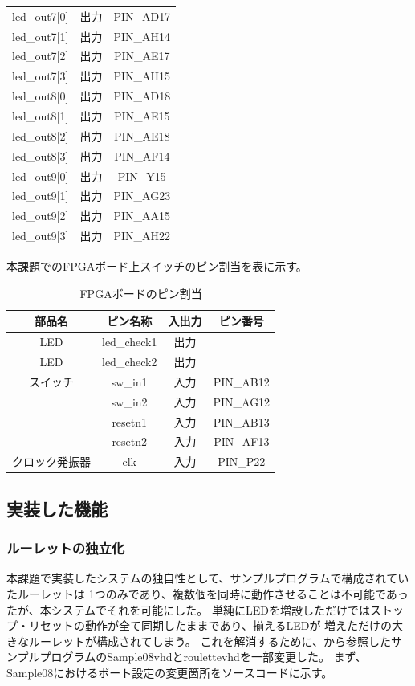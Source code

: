 \documentclass{ltjsarticle}
\begin{document}
\begin{table}[H]
\begin{center}
\begin{tabular}{cc|c}
			led\_out7[0]&出力&PIN\_AD17\\
			led\_out7[1]&出力&PIN\_AH14\\
			led\_out7[2]&出力&PIN\_AE17\\
			led\_out7[3]&出力&PIN\_AH15\\
			led\_out8[0]&出力&PIN\_AD18\\
			led\_out8[1]&出力&PIN\_AE15\\
			led\_out8[2]&出力&PIN\_AE18\\
			led\_out8[3]&出力&PIN\_AF14\\
			led\_out9[0]&出力&PIN\_Y15\\
			led\_out9[1]&出力&PIN\_AG23\\
			led\_out9[2]&出力&PIN\_AA15\\
			led\_out9[3]&出力&PIN\_AH22\\ \hline
		\end{tabular}
		\end{center}
		\end{table}

	本課題でのFPGAボード上スイッチのピン割当を表に示す。
		\begin{table}[H]
		\begin{center}
		\caption{FPGAボードのピン割当}
		\label{tab:SWpin}
		\begin{tabular}{c|cc|c} \toprule
			部品名&ピン名称&入出力&ピン番号\\ \hline
			LED&led\_check1&出力&\\
			LED&led\_check2&出力&\\ \hline
			スイッチ&sw\_in1&入力&PIN\_AB12\\
			&sw\_in2&入力&PIN\_AG12\\
			&resetn1&入力&PIN\_AB13\\
			&resetn2&入力&PIN\_AF13\\ \hline
			クロック発振器&clk&入力&PIN\_P22\\
		\bottomrule
		\end{tabular}
		\end{center}
		\end{table}
	\subsection{実装した機能}
		\subsubsection{ルーレットの独立化}
			本課題で実装したシステムの独自性として、サンプルプログラムで構成されていたルーレットは
			1つのみであり、複数個を同時に動作させることは不可能であったが、本システムでそれを可能にした。
			単純にLEDを増設しただけではストップ・リセットの動作が全て同期したままであり、揃えるLEDが
			増えただけの大きなルーレットが構成されてしまう。
			これを解消するために、\cite{ref:指導書}から参照したサンプルプログラムのSample08vhdとroulettevhdを一部変更した。
			まず、Sample08におけるポート設定の変更箇所をソースコードに示す。
\end{document}
